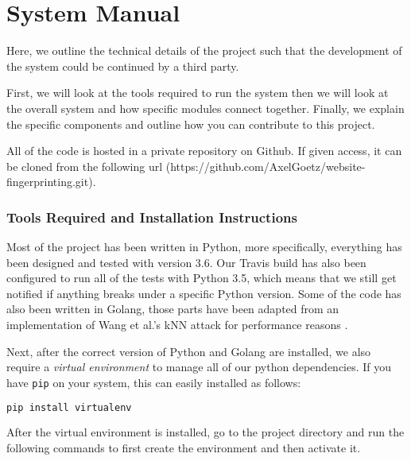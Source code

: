 

\chapter{System Manual}

\begingroup

\renewcommand{\thesubsection}{\arabic{subsection}}

\renewcommand{\addcontentsline}[3]{}%

Here, we outline the technical details of the project such that the development of the system could be continued by a third party.

First, we will look at the tools required to run the system then we will look at the overall system and how specific modules connect together.
Finally, we explain the specific components and outline how you can contribute to this project.

All of the code is hosted in a private repository on Github.
If given access, it can be cloned from the following url (https://github.com/AxelGoetz/website-fingerprinting.git).

\subsection{Tools Required and Installation Instructions}

Most of the project has been written in Python, more specifically, everything has been designed and tested with version 3.6.
Our Travis build has also been configured to run all of the tests with Python 3.5, which means that we still get notified if anything breaks under a specific Python version.
Some of the code has also been written in Golang, those parts have been adapted from an implementation of Wang et al.'s kNN attack for performance reasons \cite{wang_cai_johnson_nithyanand_goldberg_2014,gokNN}.

Next, after the correct version of Python and Golang are installed, we also require a \textit{virtual environment} to manage all of our python dependencies.
If you have \texttt{pip} on your system, this can easily installed as follows:

\begin{lstlisting}[language=Bash]
pip install virtualenv
\end{lstlisting}

After the virtual environment is installed, go to the project directory and run the following commands to first create the environment and then activate it.

